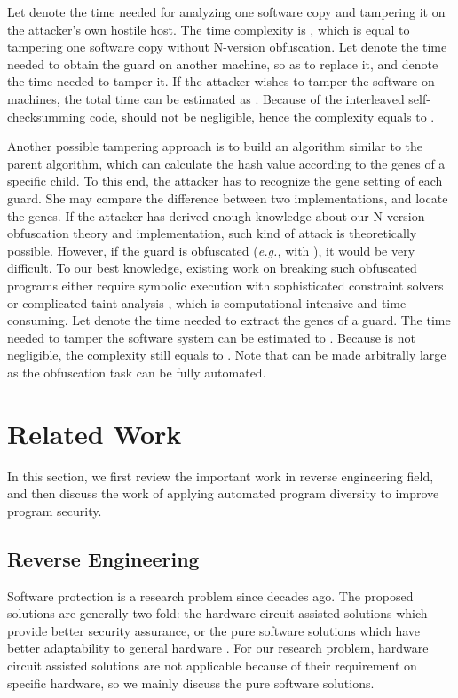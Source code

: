 \documentclass[10pt, conference]{IEEEtran}
\begin{document}
Let  denote the time needed for analyzing one software copy and tampering it on the attacker's own hostile host.  The time complexity is , which is equal to tampering one software copy without N-version obfuscation.  Let  denote the time needed to obtain the guard on another machine, so as to replace it, and  denote the time needed to tamper it.  If the attacker wishes to tamper the software on  machines, the total time can be estimated as .  Because of the interleaved self-checksumming code,  should not be negligible, hence the complexity equals to . 

Another possible tampering approach is to build an algorithm similar to the parent algorithm, which can calculate the hash value according to the genes of a specific child.  To this end, the attacker has to recognize the gene setting of each guard.  She may compare the difference between two implementations, and locate the genes.  If the attacker has derived enough knowledge about our N-version obfuscation theory and implementation, such kind of attack is theoretically possible.  However, if the guard is obfuscated (\textit{e.g.,} with \cite{ogiso2003software}), it would be very difficult.  To our best knowledge, existing work on breaking such obfuscated programs either require symbolic execution with sophisticated constraint solvers or complicated taint analysis \cite{yadegari2015generic}, which is computational intensive and time-consuming.  Let  denote the time needed to extract the genes of a guard.  The time needed to tamper the software system can be estimated to .  Because  is not negligible, the complexity still equals to .  Note that  can be made arbitrally large as the obfuscation task can be fully automated.

\section{Related Work} \label{section:literature}

In this section, we first review the important work in reverse engineering field, and then discuss the work of applying automated program diversity to improve program security.

\subsection{Reverse Engineering}
Software protection is a research problem since decades ago.  The proposed solutions are generally two-fold: the hardware circuit assisted solutions which provide better security assurance, or the pure software solutions which have better adaptability to general hardware \cite{chen2003oblivious}.  For our research problem, hardware circuit assisted solutions are not applicable because of their requirement on specific hardware, so we mainly discuss the pure software solutions.
\end{document}
